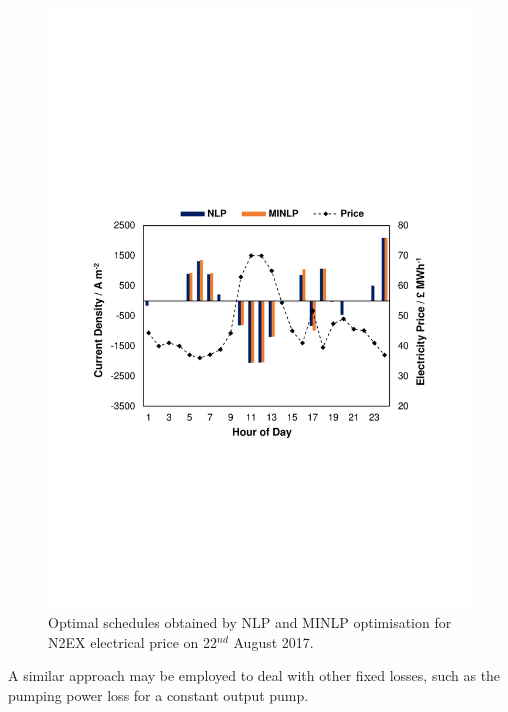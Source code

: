\documentclass[preprint,3p,review,authoryear,10pt]{elsarticle}
\begin{document}
 \begin{figure}[!ht]
\centering
\includegraphics[trim = 2cm 8cm 2cm 9cm, clip, width = .5\textwidth]{./figures/MINLP_schedule.pdf}
\caption{Optimal schedules obtained by NLP and MINLP optimisation for N2EX electrical price on 22$^{nd}$ August 2017.}
\label{fig:MINLP_on_EffC}
\end{figure}
 
  
A similar approach may be employed to deal with other fixed losses, such as the pumping power loss for a constant output pump.
\end{document}
